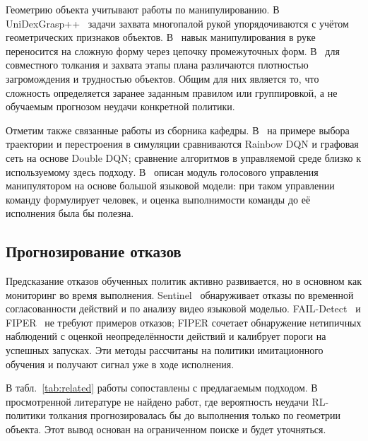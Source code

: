 \documentclass{misisarticle}
\begin{document}
Геометрию объекта учитывают работы по манипулированию. В UniDexGrasp++~\cite{wan2023} задачи захвата многопалой рукой упорядочиваются с учётом геометрических признаков объектов. В~\cite{zhang2023} навык манипулирования в руке переносится на сложную форму через цепочку промежуточных форм. В~\cite{huang2026} для совместного толкания и захвата этапы плана различаются плотностью загромождения и трудностью объектов. Общим для них является то, что сложность определяется заранее заданным правилом или группировкой, а не обучаемым прогнозом неудачи конкретной политики.

Отметим также связанные работы из сборника кафедры. В~\cite{kiselev2025} на примере выбора траектории и перестроения в симуляции сравниваются Rainbow DQN и графовая сеть на основе Double DQN; сравнение алгоритмов в управляемой среде близко к используемому здесь подходу. В~\cite{savelyev2025} описан модуль голосового управления манипулятором на основе большой языковой модели: при таком управлении команду формулирует человек, и оценка выполнимости команды до её исполнения была бы полезна.

\subsection{Прогнозирование отказов}

Предсказание отказов обученных политик активно развивается, но в основном как мониторинг во время выполнения. Sentinel~\cite{agia2024} обнаруживает отказы по временной согласованности действий и по анализу видео языковой моделью. FAIL-Detect~\cite{xu2025} и FIPER~\cite{romer2025} не требуют примеров отказов; FIPER сочетает обнаружение нетипичных наблюдений с оценкой неопределённости действий и калибрует пороги на успешных запусках. Эти методы рассчитаны на политики имитационного обучения и получают сигнал уже в ходе исполнения.

В табл.~\ref{tab:related} работы сопоставлены с предлагаемым подходом. В просмотренной литературе не найдено работ, где вероятность неудачи RL-политики толкания прогнозировалась бы до выполнения только по геометрии объекта. Этот вывод основан на ограниченном поиске и будет уточняться.
\end{document}
